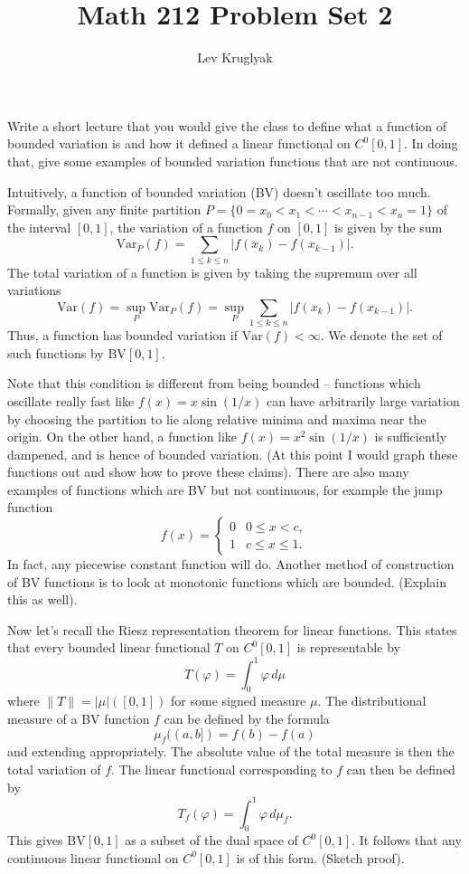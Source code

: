 \documentclass{lkx_pset}
\title{Math 212 Problem Set 2}
\author{Lev Kruglyak}
\begin{document}
\maketitle

\begin{problem}{1}
  Write a short lecture that you would give the class to define what a function of bounded variation is and how it defined a linear functional on $C^0[0,1]$. In doing that, give some examples of bounded variation functions that are not continuous.
\end{problem}
\begin{solution}
  Intuitively, a function of bounded variation (BV) doesn't oscillate too much. Formally, given any finite partition $P = \{0=x_0 < x_1 < \cdots < x_{n-1} < x_n = 1\}$ of the interval $[0,1]$, the variation of a function $f$ on $[0,1]$ is given by the sum
  \[
    \mathrm{Var}_P(f) = \sum_{1\leq k \leq n} |f(x_k)-f(x_{k-1})|.
  \]
  The total variation of a function is given by taking the supremum over all variations
  \[
    \mathrm{Var}(f) = \sup_{P} \mathrm{Var}_P(f)=\sup_{P}\sum_{1\leq k \leq n} |f(x_k)-f(x_{k-1})|.
  \]
  Thus, a function has bounded variation if $\mathrm{Var}(f)<\infty$. We denote the set of such functions by $\mathrm{BV}[0,1]$.

  Note that this condition is different from being bounded -- functions which oscillate really fast like $f(x)=x\sin(1/x)$ can have arbitrarily large variation by choosing the partition to lie along relative minima and maxima near the origin. On the other hand, a function like $f(x)=x^2\sin(1/x)$ is sufficiently dampened, and is hence of bounded variation. (At this point I would graph these functions out and show how to prove these claims). There are also many examples of functions which are BV but not continuous, for example the jump function 
  \[
    f(x) =\begin{cases} 0 & 0\leq x < c, \\ 1 & c\leq x \leq 1.\end{cases}
  \]
  In fact, any piecewise constant function will do. Another method of construction of BV functions is to look at monotonic functions which are bounded. (Explain this as well).

  Now let's recall the Riesz representation theorem for linear functions. This states that every bounded linear functional $T$ on $C^0[0,1]$ is representable by
  \[
    T(\varphi) = \int_0^1 \varphi \,d\mu
  \]
  where $\|T\|=|\mu|([0,1])$ for some signed measure $\mu$. The distributional measure of a BV function $f$ can be defined by the formula
  \[
    \mu_f((a,b]) = f(b)-f(a)
  \]
  and extending appropriately. The absolute value of the total measure is then the total variation of $f$. The linear functional corresponding to $f$ can then be defined by
  \[
    T_f(\varphi) = \int_0^1 \varphi \,d\mu_f.
  \]
  This gives $\mathrm{BV}[0,1]$ as a subset of the dual space of $C^0[0,1]$. It follows that any continuous linear functional on $C^0[0,1]$ is of this form. (Sketch proof).
\end{solution}
\end{document}
